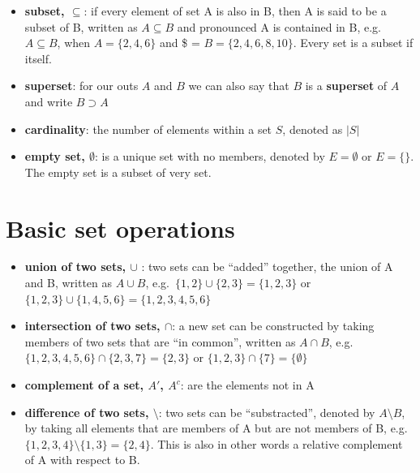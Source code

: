 \documentclass[
]{book}
\providecommand{\tightlist}{%
  \setlength{\itemsep}{0pt}\setlength{\parskip}{0pt}}
\theoremstyle{definition}
\theoremstyle{definition}
\theoremstyle{definition}
\theoremstyle{remark}
\begin{document}
\begin{itemize}
\tightlist
\item
  \textbf{subset, \(\subseteq\)}: if every element of set A is also in B, then A is said to be a subset of B, written as \(A \subseteq B\) and pronounced A is contained in B, e.g.~\(A \subseteq B\), when \(A = \{2, 4, 6\}\) and \$ = \(B = \{2, 4, 6, 8, 10\}\). Every set is a subset if itself.
\item
  \textbf{superset}: for our outs \(A\) and \(B\) we can also say that \(B\) is a \textbf{superset} of \(A\) and write \(B \supset A\)
\end{itemize}

\begin{itemize}
\tightlist
\item
  \textbf{cardinality}: the number of elements within a set \(S\), denoted as \(|S|\)
\item
  \textbf{empty set, \(\emptyset\)}: is a unique set with no members, denoted by \(E = \emptyset\) or \(E = \{\}\). The empty set is a subset of very set.
\end{itemize}

\hypertarget{basic-set-operations}{%
\section{Basic set operations}\label{basic-set-operations}}

\begin{itemize}
\tightlist
\item
  \textbf{union of two sets, \(\cup\) }: two sets can be ``added'' together, the union of A and B, written as \(A \cup B\), e.g.~\(\{1, 2\} \cup \{2, 3\} = \{1, 2, 3\}\) or \(\{1, 2, 3\} \cup \{1, 4, 5, 6\} = \{1, 2, 3, 4, 5, 6\}\)
\item
  \textbf{intersection of two sets, \(\cap\)}: a new set can be constructed by taking members of two sets that are ``in common'', written as \(A \cap B\), e.g.~\(\{1, 2, 3, 4, 5, 6\} \cap \{2, 3, 7\} = \{2, 3\}\) or \(\{1, 2, 3\} \cap \{7 \} = \{\emptyset \}\)
\end{itemize}

\begin{itemize}
\tightlist
\item
  \textbf{complement of a set, \(A'\), \(A^c\)}: are the elements not in A
\item
  \textbf{difference of two sets, \(\setminus\)}: two sets can be ``substracted'', denoted by \(A \setminus B\), by taking all elements that are members of A but are not members of B, e.g.~\(\{1, 2, 3, 4\} \setminus \{1, 3\} = \{2, 4\}\). This is also in other words a relative complement of A with respect to B.
\end{itemize}
\end{document}
